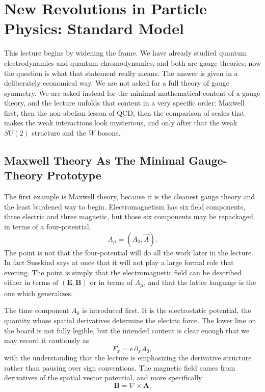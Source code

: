 \chapter{New Revolutions in Particle Physics: Standard Model}

This lecture begins by widening the frame. We have already studied quantum electrodynamics and quantum chromodynamics, and both are gauge theories; now the question is what that statement really means. The answer is given in a deliberately economical way. We are not asked for a full theory of gauge symmetry. We are asked instead for the minimal mathematical content of a gauge theory, and the lecture unfolds that content in a very specific order: Maxwell first, then the non-abelian lesson of QCD, then the comparison of scales that makes the weak interactions look mysterious, and only after that the weak \(SU(2)\) structure and the \(W\) bosons.

\section{Maxwell Theory As The Minimal Gauge-Theory Prototype}

The first example is Maxwell theory, because it is the cleanest gauge theory and the least burdened way to begin. Electromagnetism has six field components, three electric and three magnetic, but those six components may be repackaged in terms of a four-potential,
\begin{equation}
A_\mu=(A_0,\vec A).
\end{equation}
The point is not that the four-potential will do all the work later in the lecture. In fact Susskind says at once that it will not play a large formal role that evening. The point is simply that the electromagnetic field can be described either in terms of \((\mathbf E,\mathbf B)\) or in terms of \(A_\mu\), and that the latter language is the one which generalizes.

The time component \(A_0\) is introduced first. It is the electrostatic potential, the quantity whose spatial derivatives determine the electric force. The lower line on the board is not fully legible, but the intended content is clear enough that we may record it cautiously as
\begin{equation}
F_x = e\,\partial_x A_0,
\end{equation}
with the understanding that the lecture is emphasizing the derivative structure rather than pausing over sign conventions. The magnetic field comes from derivatives of the spatial vector potential, and more specifically
\begin{equation}
\mathbf B=\nabla\times\mathbf A.
\end{equation}

